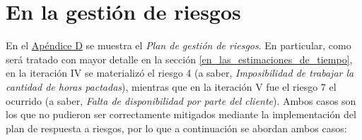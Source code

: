 \documentclass[a4paper, 12pt,twoside]{report}  %
\numberwithin{equation}{subsection} %
\begin{document}
\begin{itemize}
\end{itemize}

\section{En la gestión de riesgos}
En el \hyperlink{apendice_d}{Apéndice D} se muestra el \textit{Plan de gestión de riesgos}. En particular, como será tratado con mayor detalle en la sección \ref{en_las_estimaciones_de_tiempo}, en la iteración IV se materializó el riesgo 4 (a saber, \textit{Imposibilidad de trabajar la cantidad de horas pactadas}), mientras que en la iteración V fue el riesgo 7 el ocurrido (a saber, \textit{Falta de disponibilidad por parte del cliente}). Ambos casos son los que no pudieron ser correctamente mitigados mediante la implementación del plan de respuesta a riesgos, por lo que a continuación se abordan ambos casos:
\end{document}
